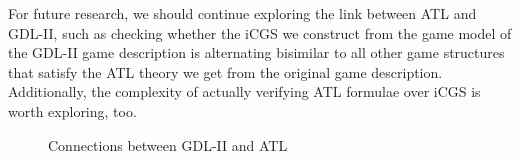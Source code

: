 \documentclass{article}
\theoremstyle{theorem}
\theoremstyle{lemma}
\theoremstyle{definition}
\theoremstyle{remark}
\begin{document}
For future research, we should continue exploring the link between ATL and GDL-II, such as checking whether the iCGS we construct from the game model of the GDL-II game description is alternating bisimilar to all other game structures that satisfy the ATL theory we get from the original game description. Additionally, the complexity of actually verifying ATL formulae over iCGS is worth exploring, too.

\usetikzlibrary{cd}
\begin{figure}[h!]
\caption{Connections between GDL-II and ATL}
\end{figure}


\newpage 


\end{document}
